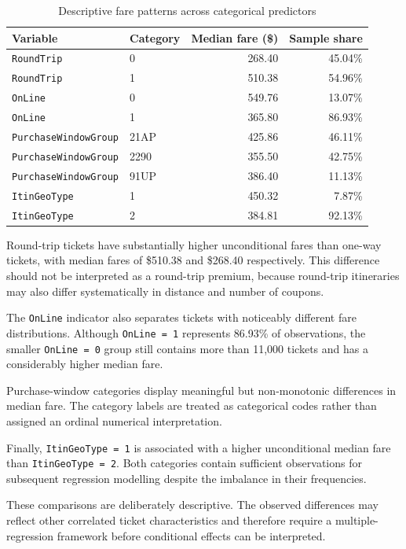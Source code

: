 \documentclass[11pt,a4paper]{article}
\begin{document}
\begin{table}[H]
\centering
\caption{Descriptive fare patterns across categorical predictors}
\label{tab:categorical-eda}
\begin{tabular}{llrr}
\toprule
\textbf{Variable} & \textbf{Category} & \textbf{Median fare (\$)} & \textbf{Sample share} \\
\midrule
\texttt{RoundTrip} & 0 & 268.40 & 45.04\% \\
\texttt{RoundTrip} & 1 & 510.38 & 54.96\% \\
\addlinespace
\texttt{OnLine} & 0 & 549.76 & 13.07\% \\
\texttt{OnLine} & 1 & 365.80 & 86.93\% \\
\addlinespace
\texttt{PurchaseWindowGroup} & 21AP & 425.86 & 46.11\% \\
\texttt{PurchaseWindowGroup} & 2290 & 355.50 & 42.75\% \\
\texttt{PurchaseWindowGroup} & 91UP & 386.40 & 11.13\% \\
\addlinespace
\texttt{ItinGeoType} & 1 & 450.32 & 7.87\% \\
\texttt{ItinGeoType} & 2 & 384.81 & 92.13\% \\
\bottomrule
\end{tabular}
\end{table}

Round-trip tickets have substantially higher unconditional fares than one-way tickets, with median fares of \$510.38 and \$268.40 respectively. This difference should not be interpreted as a round-trip premium, because round-trip itineraries may also differ systematically in distance and number of coupons.

The \texttt{OnLine} indicator also separates tickets with noticeably different fare distributions. Although \texttt{OnLine = 1} represents 86.93\% of observations, the smaller \texttt{OnLine = 0} group still contains more than 11,000 tickets and has a considerably higher median fare.

Purchase-window categories display meaningful but non-monotonic differences in median fare. The category labels are treated as categorical codes rather than assigned an ordinal numerical interpretation.

Finally, \texttt{ItinGeoType = 1} is associated with a higher unconditional median fare than \texttt{ItinGeoType = 2}. Both categories contain sufficient observations for subsequent regression modelling despite the imbalance in their frequencies.

These comparisons are deliberately descriptive. The observed differences may reflect other correlated ticket characteristics and therefore require a multiple-regression framework before conditional effects can be interpreted.
\end{document}
